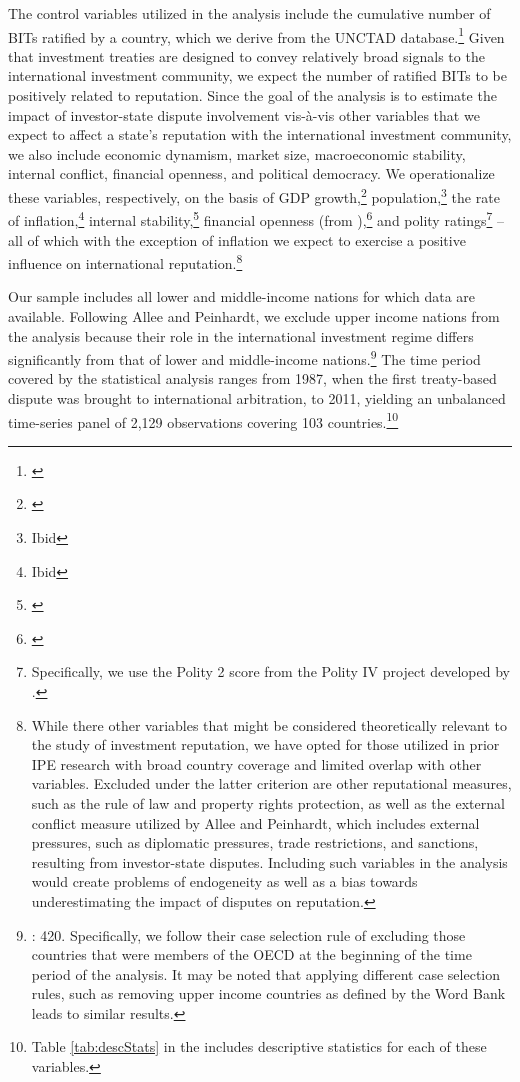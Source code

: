 \documentclass[12pt,onesided]{amsart}
\begin{document}
The control variables utilized in the analysis include the cumulative number of BITs ratified by a country, which we derive from the UNCTAD database.\footnote{\citet{unctad:2013c}} Given that investment treaties are designed to convey relatively broad signals to the international investment community, we expect the number of ratified BITs to be positively related to reputation. Since the goal of the analysis is to estimate the impact of investor-state dispute involvement vis-\`{a}-vis other variables that we expect to affect a state's reputation with the international investment community, we also include economic dynamism, market size, macroeconomic stability, internal conflict, financial openness, and political democracy. We operationalize these variables, respectively, on the basis of GDP growth,\footnote{\citet{worldbank:2013}} population,\footnote{Ibid} the rate of inflation,\footnote{Ibid} internal stability,\footnote{\citet{prs:2013}} financial openness (from \citeauthor{chinn:ito:2008}),\footnote{\citet{chinn:ito:2008}} and polity ratings\footnote{Specifically, we use the Polity 2 score from the Polity IV project developed by \citet{marshall2013polity}.} -- all of which with the exception of inflation we expect to exercise a positive influence on international reputation.\footnote{While there other variables that might be considered theoretically relevant to the study of investment reputation, we have opted for those utilized in prior IPE research with broad country coverage and limited overlap with other variables. Excluded under the latter criterion are other reputational measures, such as the rule of law and property rights protection, as well as the external conflict measure utilized by Allee and Peinhardt, which includes external pressures, such as diplomatic pressures, trade restrictions, and sanctions, resulting from investor-state disputes. Including such variables in the analysis would create problems of endogeneity as well as a bias towards underestimating the impact of disputes on reputation.}

Our sample includes all lower and middle-income nations for which data are available. Following Allee and Peinhardt, we exclude upper income nations from the analysis because their role in the international investment regime differs significantly from that of lower and middle-income nations.\footnote{\citet{allee:peinhardt:2011}: 420. Specifically, we follow their case selection rule of excluding those countries that were members of the OECD at the beginning of the time period of the analysis. It may be noted that applying different case selection rules, such as removing upper income countries as defined by the Word Bank leads to similar results.} The time period covered by the statistical analysis ranges from 1987, when the first treaty-based dispute was brought to international arbitration, to 2011, yielding an unbalanced time-series panel of 2,129 observations covering 103 countries.\footnote{Table \ref{tab:descStats} in the  includes descriptive statistics for each of these variables.} 
\end{document}
